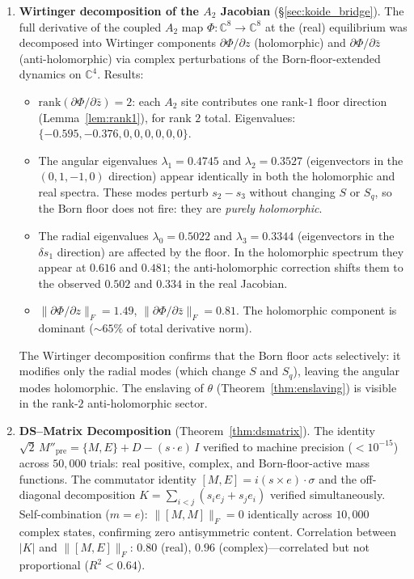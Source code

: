 \documentclass[11pt,a4paper]{article}
\theoremstyle{definition}
\theoremstyle{remark}
\newcommand{\C}{\mathbb{C}}
\begin{document}
\begin{enumerate}[nosep]
\item \textbf{Wirtinger decomposition of the $A_2$ Jacobian} (\S\ref{sec:koide_bridge}). The full derivative of the coupled $A_2$ map $\Phi:\C^8\to\C^8$ at the (real) equilibrium was decomposed into Wirtinger components $\partial\Phi/\partial z$ (holomorphic) and $\partial\Phi/\partial\bar{z}$ (anti-holomorphic) via complex perturbations of the Born-floor-extended dynamics on $\C^4$. Results:
\begin{itemize}[nosep]
\item $\mathrm{rank}(\partial\Phi/\partial\bar{z})=2$: each $A_2$ site contributes one rank-$1$ floor direction (Lemma~\ref{lem:rank1}), for rank $2$ total. Eigenvalues: $\{-0.595,-0.376,0,0,0,0,0,0\}$.
\item The angular eigenvalues $\lambda_1=0.4745$ and $\lambda_2=0.3527$ (eigenvectors in the $(0,1,-1,0)$ direction) appear identically in both the holomorphic and real spectra. These modes perturb $s_2-s_3$ without changing $S$ or $S_q$, so the Born floor does not fire: they are \emph{purely holomorphic}.
\item The radial eigenvalues $\lambda_0=0.5022$ and $\lambda_3=0.3344$ (eigenvectors in the $\delta s_1$ direction) are affected by the floor. In the holomorphic spectrum they appear at $0.616$ and $0.481$; the anti-holomorphic correction shifts them to the observed $0.502$ and $0.334$ in the real Jacobian.
\item $\|\partial\Phi/\partial z\|_F=1.49$, $\|\partial\Phi/\partial\bar{z}\|_F=0.81$. The holomorphic component is dominant ($\sim\!65\%$ of total derivative norm).
\end{itemize}
The Wirtinger decomposition confirms that the Born floor acts selectively: it modifies only the radial modes (which change $S$ and $S_q$), leaving the angular modes holomorphic. The enslaving of $\theta$ (Theorem~\ref{thm:enslaving}) is visible in the rank-$2$ anti-holomorphic sector.

\item \textbf{DS--Matrix Decomposition} (Theorem~\ref{thm:dsmatrix}). The identity $\sqrt{2}\,M''_{\mathrm{pre}}=\{M,E\}+D-(s\cdot e)\,I$ verified to machine precision ($<10^{-15}$) across $50{,}000$ trials: real positive, complex, and Born-floor-active mass functions. The commutator identity $[M,E]=i(s\times e)\cdot\sigma$ and the off-diagonal decomposition $K=\sum_{i<j}(s_ie_j+s_je_i)$ verified simultaneously. Self-combination ($m=e$): $\|[M,M]\|_F=0$ identically across $10{,}000$ complex states, confirming zero antisymmetric content. Correlation between $|K|$ and $\|[M,E]\|_F$: $0.80$ (real), $0.96$ (complex)---correlated but not proportional ($R^2<0.64$).


\end{enumerate}
\end{document}
